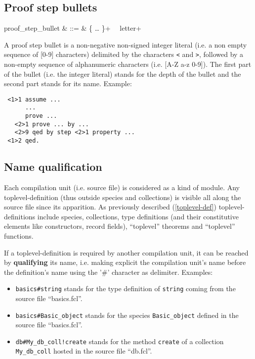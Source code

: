 \subsection{Proof step bullets}
\begin{syntax}
proof\_step\_bullet & ::= &
   \terminal{<} \{  \ldots {} \}+\ \terminal{>}
   \ letter+
\end{syntax}

A proof step bullet is a non-negative non-signed integer literal
(i.e. a non empty sequence of [0-9] characters) delimited by the
characters {\tt <} and {\tt >}, followed by a non-empty sequence of
alphanumeric characters (i.e. [A-Z a-z 0-9]). 
The first part of the bullet (i.e. the integer literal) stands for the
depth of the bullet and the second part stands for its name. Example:
{\scriptsize
\begin{lstlisting}
 <1>1 assume ...
      ...
      prove ...
   <2>1 prove ... by ...
   <2>9 qed by step <2>1 property ...
 <1>2 qed.
\end{lstlisting}
}



\subsection{Name qualification}
\label{qualified-name}
Each compilation unit (i.e. source file) is considered as a kind of
module. Any toplevel-definition (thus outside
species and collections) is visible all along the source file since its
apparition. As previously described (\ref{toplevel-def})
toplevel-definitions  include
species, collections, type definitions (and their constitutive elements
like constructors, record fields), ``toplevel'' theorems and
``toplevel'' functions.

If a toplevel-definition is required by another compilation unit, it can
be reached by {\bf qualifying} its name, i.e. making explicit the
compilation unit's name before the definition's name using the '\#'
character as delimiter. Examples:

\begin{itemize}
  \item {\tt basics\#string} stands for the type definition of
    {\tt string} coming from the source file ``basics.fcl''.
  \item {\tt  basics\#Basic\_object} stands for the species
    {\tt Basic\_object} defined in the source file ``basics.fcl''.
  \item {\tt db\#My\_db\_coll!create} stands for the method
    {\tt create} of a collection {\tt My\_db\_coll} hosted in the
    source file ``db.fcl''.
\end{itemize}

